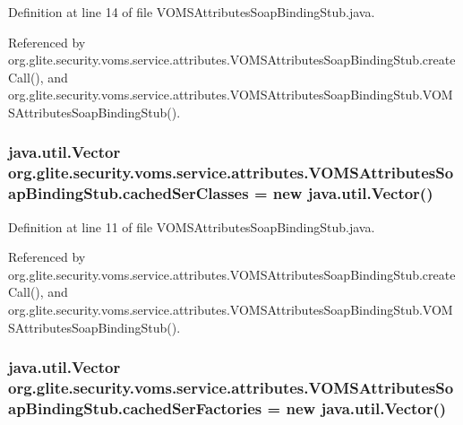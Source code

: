 Definition at line 14 of file VOMSAttributesSoapBindingStub.java.



Referenced by org.glite.security.voms.service.attributes.VOMSAttributesSoapBindingStub.createCall(), and org.glite.security.voms.service.attributes.VOMSAttributesSoapBindingStub.VOMSAttributesSoapBindingStub().

\hypertarget{classorg_1_1glite_1_1security_1_1voms_1_1service_1_1attributes_1_1VOMSAttributesSoapBindingStub_a28fcd023493f71b38d25d3d16b870892}{
\subsubsection[{cachedSerClasses}]{\setlength{\rightskip}{0pt plus 5cm}java.util.Vector {\bf org.glite.security.voms.service.attributes.VOMSAttributesSoapBindingStub.cachedSerClasses} = new java.util.Vector()}}
\label{classorg_1_1glite_1_1security_1_1voms_1_1service_1_1attributes_1_1VOMSAttributesSoapBindingStub_a28fcd023493f71b38d25d3d16b870892}


Definition at line 11 of file VOMSAttributesSoapBindingStub.java.



Referenced by org.glite.security.voms.service.attributes.VOMSAttributesSoapBindingStub.createCall(), and org.glite.security.voms.service.attributes.VOMSAttributesSoapBindingStub.VOMSAttributesSoapBindingStub().

\hypertarget{classorg_1_1glite_1_1security_1_1voms_1_1service_1_1attributes_1_1VOMSAttributesSoapBindingStub_aa3c0377ecdf8027a91f2d8116e98d670}{
\subsubsection[{cachedSerFactories}]{\setlength{\rightskip}{0pt plus 5cm}java.util.Vector {\bf org.glite.security.voms.service.attributes.VOMSAttributesSoapBindingStub.cachedSerFactories} = new java.util.Vector()}}
\label{classorg_1_1glite_1_1security_1_1voms_1_1service_1_1attributes_1_1VOMSAttributesSoapBindingStub_aa3c0377ecdf8027a91f2d8116e98d670}


